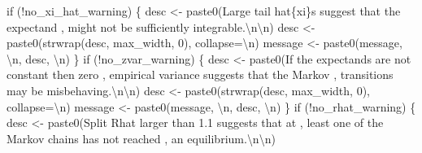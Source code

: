 \documentclass[
  letterpaper,
  DIV=11,
  numbers=noendperiod]{scrartcl}
\newenvironment{Shaded}{\begin{snugshade}}{\end{snugshade}}
\newcommand{\CharTok}[1]{\textcolor[rgb]{0.13,0.47,0.30}{#1}}
\newcommand{\ControlFlowTok}[1]{\textcolor[rgb]{0.00,0.23,0.31}{#1}}
\newcommand{\DecValTok}[1]{\textcolor[rgb]{0.68,0.00,0.00}{#1}}
\newcommand{\NormalTok}[1]{\textcolor[rgb]{0.00,0.23,0.31}{#1}}
\newcommand{\OperatorTok}[1]{\textcolor[rgb]{0.37,0.37,0.37}{#1}}
\newcommand{\SpecialCharTok}[1]{\textcolor[rgb]{0.37,0.37,0.37}{#1}}
\newcommand{\StringTok}[1]{\textcolor[rgb]{0.13,0.47,0.30}{#1}}
\begin{document}
\begin{Shaded}
\begin{Highlighting}[]
  \ControlFlowTok{if}\NormalTok{ (}\OperatorTok{!}\NormalTok{no\_xi\_hat\_warning) \{}
\NormalTok{    desc }\OperatorTok{\textless{}{-}}\NormalTok{ paste0(}\StringTok{\textquotesingle{}Large tail hat}\SpecialCharTok{\{xi\}}\StringTok{s suggest that the expectand \textquotesingle{}}\NormalTok{,}
                   \StringTok{\textquotesingle{}might not be sufficiently integrable.}\CharTok{\textbackslash{}n\textbackslash{}n}\StringTok{\textquotesingle{}}\NormalTok{)}
\NormalTok{    desc }\OperatorTok{\textless{}{-}}\NormalTok{ paste0(strwrap(desc, max\_width, }\DecValTok{0}\NormalTok{), collapse}\OperatorTok{=}\StringTok{\textquotesingle{}}\CharTok{\textbackslash{}n}\StringTok{\textquotesingle{}}\NormalTok{)}
\NormalTok{    message }\OperatorTok{\textless{}{-}}\NormalTok{ paste0(message, }\StringTok{\textquotesingle{}}\CharTok{\textbackslash{}n}\StringTok{\textquotesingle{}}\NormalTok{, desc, }\StringTok{\textquotesingle{}}\CharTok{\textbackslash{}n}\StringTok{\textquotesingle{}}\NormalTok{)}
\NormalTok{  \}}
  \ControlFlowTok{if}\NormalTok{ (}\OperatorTok{!}\NormalTok{no\_zvar\_warning) \{}
\NormalTok{    desc }\OperatorTok{\textless{}{-}}\NormalTok{ paste0(}\StringTok{\textquotesingle{}If the expectands are not constant then zero \textquotesingle{}}\NormalTok{,}
                   \StringTok{\textquotesingle{}empirical variance suggests that the Markov \textquotesingle{}}\NormalTok{,}
                   \StringTok{\textquotesingle{}transitions may be misbehaving.}\CharTok{\textbackslash{}n\textbackslash{}n}\StringTok{\textquotesingle{}}\NormalTok{)}
\NormalTok{    desc }\OperatorTok{\textless{}{-}}\NormalTok{ paste0(strwrap(desc, max\_width, }\DecValTok{0}\NormalTok{), collapse}\OperatorTok{=}\StringTok{\textquotesingle{}}\CharTok{\textbackslash{}n}\StringTok{\textquotesingle{}}\NormalTok{)}
\NormalTok{    message }\OperatorTok{\textless{}{-}}\NormalTok{ paste0(message, }\StringTok{\textquotesingle{}}\CharTok{\textbackslash{}n}\StringTok{\textquotesingle{}}\NormalTok{, desc, }\StringTok{\textquotesingle{}}\CharTok{\textbackslash{}n}\StringTok{\textquotesingle{}}\NormalTok{)}
\NormalTok{  \}}
  \ControlFlowTok{if}\NormalTok{ (}\OperatorTok{!}\NormalTok{no\_rhat\_warning) \{}
\NormalTok{    desc }\OperatorTok{\textless{}{-}}\NormalTok{ paste0(}\StringTok{\textquotesingle{}Split Rhat larger than 1.1 suggests that at \textquotesingle{}}\NormalTok{,}
                   \StringTok{\textquotesingle{}least one of the Markov chains has not reached \textquotesingle{}}\NormalTok{,}
                   \StringTok{\textquotesingle{}an equilibrium.}\CharTok{\textbackslash{}n\textbackslash{}n}\StringTok{\textquotesingle{}}\NormalTok{)}

\end{Highlighting}
\end{Shaded}
\end{document}
